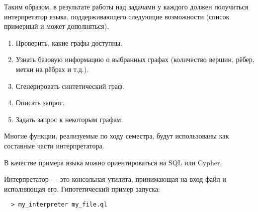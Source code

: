 Таким образом, в результате работы над задачами у каждого должен получиться интерпретатор языка, поддерживающего следующие возможности (список примерный и может дополняться).
\begin{enumerate}
\item Проверить, какие графы доступны.
\item Узнать базовую информацию о выбранных графах (количество вершин, рёбер, метки на рёбрах и т.д.).
\item Сгенерировать синтетический граф.
\item Описать запрос.
\item Задать запрос к некоторым графам.
\end{enumerate}
Многие функции, реализуемые по ходу семестра, будут использованы как составные части интерпретатора.

В качестве примера языка можно ориентироваться на SQL или Cypher.

Интерпретатор --- это консольная утилита, принимающая на вход файл и исполняющая его.
Гипотетический пример запуска:
\begin{verbatim}
  > my_interpreter my_file.ql
\end{verbatim}


